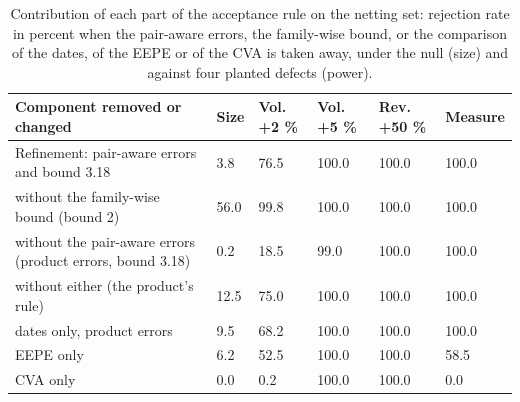 \begin{table}[htbp]
\centering
\small
\caption{Contribution of each part of the acceptance rule on the netting set: rejection rate in percent when the pair-aware errors, the family-wise bound, or the comparison of the dates, of the EEPE or of the CVA is taken away, under the null (size) and against four planted defects (power).}
\label{tab:ablation}
\begin{tabular}{p{6.4cm}lllll}
\toprule
Component removed or changed & Size & Vol. +2 \% & Vol. +5 \% & Rev. +50 \% & Measure \\
\midrule
Refinement: pair-aware errors and bound 3.18 & 3.8 & 76.5 & 100.0 & 100.0 & 100.0 \\
without the family-wise bound (bound 2) & 56.0 & 99.8 & 100.0 & 100.0 & 100.0 \\
without the pair-aware errors (product errors, bound 3.18) & 0.2 & 18.5 & 99.0 & 100.0 & 100.0 \\
without either (the product's rule) & 12.5 & 75.0 & 100.0 & 100.0 & 100.0 \\
dates only, product errors & 9.5 & 68.2 & 100.0 & 100.0 & 100.0 \\
EEPE only & 6.2 & 52.5 & 100.0 & 100.0 & 58.5 \\
CVA only & 0.0 & 0.2 & 100.0 & 100.0 & 0.0 \\
\bottomrule
\end{tabular}
\end{table}
